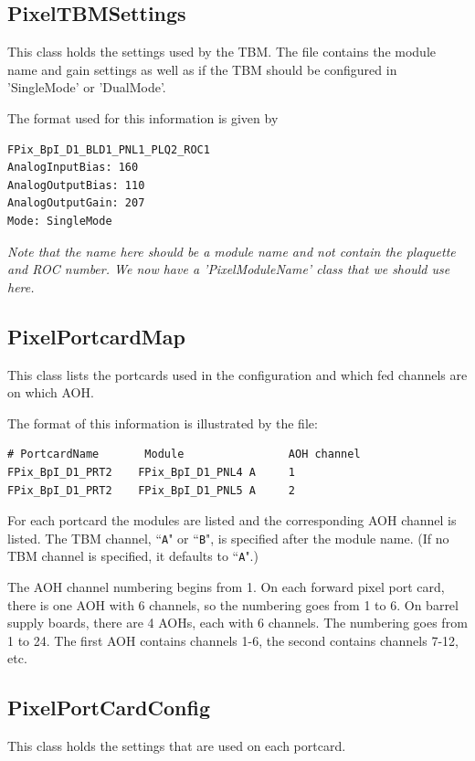 \subsection{PixelTBMSettings}

This class holds the settings used by the TBM. The file contains the
module name and gain settings as well as if the TBM should be
configured in 'SingleMode' or 'DualMode'. 

The format used for this information is given by
\begin{verbatim}
FPix_BpI_D1_BLD1_PNL1_PLQ2_ROC1
AnalogInputBias: 160
AnalogOutputBias: 110
AnalogOutputGain: 207
Mode: SingleMode
\end{verbatim}
{\it Note that the name here should be a module name and not contain
the plaquette and ROC number. We now have a 'PixelModuleName' class
that we should use here.}


\subsection{PixelPortcardMap}

This class lists the portcards used in the configuration
and which fed channels are on which AOH.

The format of this information is illustrated by the file:
\begin{verbatim}
# PortcardName       Module                AOH channel
FPix_BpI_D1_PRT2    FPix_BpI_D1_PNL4 A     1
FPix_BpI_D1_PRT2    FPix_BpI_D1_PNL5 A     2
\end{verbatim}
For each portcard the modules are listed and the corresponding
AOH channel is listed.  The TBM channel, ``\verb|A|" or ``\verb|B|", is
specified after the module name.  (If no TBM channel is specified, it
defaults to ``\verb|A|".)

The AOH channel numbering begins from 1.  On each forward pixel port card, there is one AOH with 6 channels, so the numbering goes from 1 to 6.  On barrel supply boards, there are 4 AOHs, each with 6 channels.  The numbering goes from 1 to 24.  The first AOH contains channels 1-6, the second contains channels 7-12, etc.


\subsection{PixelPortCardConfig}

This class holds the settings that are used on
each portcard.

